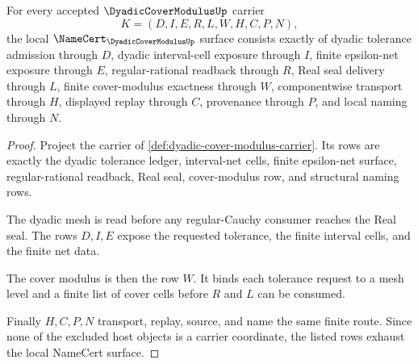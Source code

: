 \begin{theorem}
\label{thm:dyadic-cover-modulus-obligations}
For every accepted $\DyadicCoverModulusUp$ carrier
$$
K=(D,I,E,R,L,W,H,C,P,N),
$$
the local $\NameCert_{\DyadicCoverModulusUp}$ surface consists exactly of dyadic tolerance admission through $D$, dyadic interval-cell exposure through $I$, finite epsilon-net exposure through $E$, regular-rational readback through $R$, Real seal delivery through $L$, finite cover-modulus exactness through $W$, componentwise transport through $H$, displayed replay through $C$, provenance through $P$, and local naming through $N$.
\end{theorem}
\begin{proof}
Project the carrier of \autoref{def:dyadic-cover-modulus-carrier}. Its rows are exactly the dyadic tolerance ledger, interval-net cells, finite epsilon-net surface, regular-rational readback, Real seal, cover-modulus row, and structural naming rows.

The dyadic mesh is read before any regular-Cauchy consumer reaches the Real seal. The rows $D,I,E$ expose the requested tolerance, the finite interval cells, and the finite net data.

The cover modulus is then the row $W$. It binds each tolerance request to a mesh level and a finite list of cover cells before $R$ and $L$ can be consumed.

Finally $H,C,P,N$ transport, replay, source, and name the same finite route. Since none of the excluded host objects is a carrier coordinate, the listed rows exhaust the local NameCert surface.
\end{proof}

